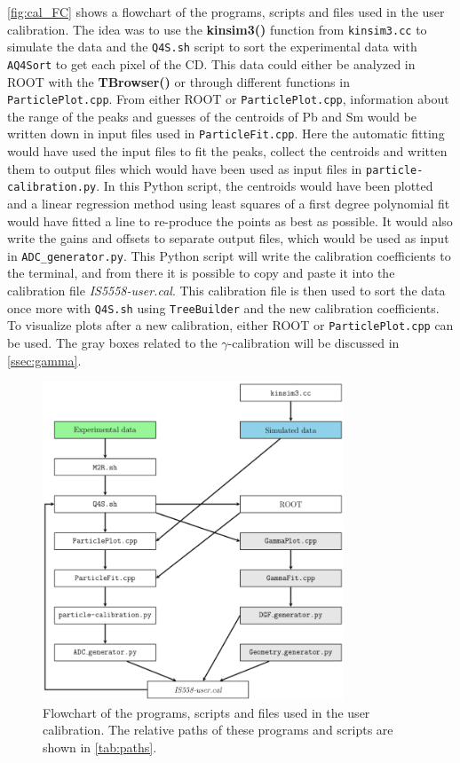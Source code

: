 \documentclass[twoside,english]{uiofysmaster/uiofysmaster}
\newcommand{\ga}{$\gamma$}
\let\orgautoref\autoref
\renewcommand{\autoref}
        {%
		 \def\sectionautorefname{Section}%
		 \def\subsectionautorefname{Section}%
		 \def\subsubsectionautorefname{Section}%
		 \def\chapterautorefname{Chapter}%
          \orgautoref}
\begin{document}
\autoref{fig:cal_FC} shows a flowchart of the programs, scripts and files used in the user calibration. 
The idea was to use the \textbf{kinsim3()} function from \texttt{kinsim3.cc} to simulate the data and the \texttt{Q4S.sh} script to sort the experimental data with \texttt{AQ4Sort} to get each pixel of the CD. 
This data could either be analyzed in ROOT with the \textbf{TBrowser()} or through different functions in \texttt{ParticlePlot.cpp}. 
From either ROOT or \texttt{ParticlePlot.cpp}, information about the range of the peaks and guesses of the centroids of Pb and Sm would be written down in input files used in \texttt{ParticleFit.cpp}. 
Here the automatic fitting would have used the input files to fit the peaks, collect the centroids and written them to output files which would have been used as input files in \texttt{particle-calibration.py}. 
In this Python script, the centroids would have been plotted and a linear regression method using least squares of a first degree polynomial fit \cite{Polyfit} would have fitted a line to re-produce the points as best as possible. 
It would also write the gains and offsets to separate output files, which would be used as input in \texttt{ADC\_generator.py}. 
This Python script will write the calibration coefficients to the terminal, and from there it is possible to copy and paste it into the calibration file \textit{IS5558-user.cal}. 
This calibration file is then used to sort the data once more with \texttt{Q4S.sh} using \texttt{TreeBuilder} and the new calibration coefficients.
To visualize plots after a new calibration, either ROOT or \texttt{ParticlePlot.cpp} can be used. 
The gray boxes related to the \ga-calibration will be discussed in \autoref{ssec:gamma}.

\begin{figure}[ht]
	\centering
	\includegraphics[width=0.8\textwidth]{Images/Flowchart.png}
	\caption{Flowchart of the programs, scripts and files used in the user calibration. The relative paths of these programs and scripts are shown in \autoref{tab:paths}.}
	\label{fig:cal_FC}
\end{figure}
\end{document}
